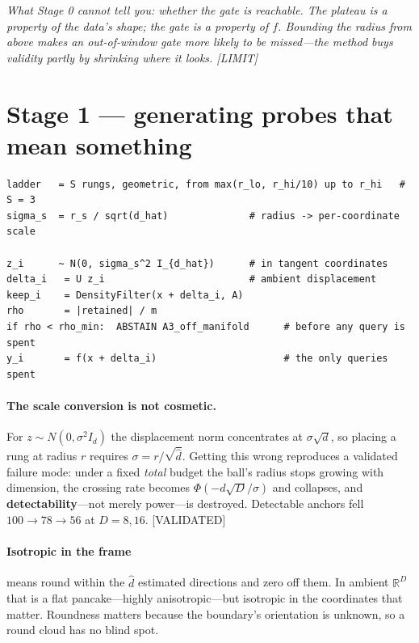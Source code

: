 \documentclass[11pt]{article}
\newcommand{\R}{\mathbb{R}}
\newcommand{\provtag}[2]{{\footnotesize\sffamily\textcolor{#1}{[#2]}}}
\newcommand{\VALID}{\provtag{okgreen}{VALIDATED}}
\newcommand{\LIMIT}{\provtag{limred}{LIMIT}}
\newcommand{\why}[1]{\par\smallskip\noindent\textcolor{muted}{\small\itshape #1}\par\smallskip}
\begin{document}
\why{What Stage 0 cannot tell you: whether the gate is \emph{reachable}. The plateau is a property
of the data's shape; the gate is a property of $f$. Bounding the radius from above makes an
out-of-window gate \emph{more} likely to be missed---the method buys validity partly by shrinking
where it looks. \LIMIT}

\section{Stage 1 --- generating probes that mean something}
\label{sec:stage1}

\begin{codebox}
\begin{verbatim}
ladder   = S rungs, geometric, from max(r_lo, r_hi/10) up to r_hi   # S = 3
sigma_s  = r_s / sqrt(d_hat)              # radius -> per-coordinate scale

z_i      ~ N(0, sigma_s^2 I_{d_hat})      # in tangent coordinates
delta_i   = U z_i                         # ambient displacement
keep_i    = DensityFilter(x + delta_i, A)
rho       = |retained| / m
if rho < rho_min:  ABSTAIN A3_off_manifold      # before any query is spent
y_i       = f(x + delta_i)                      # the only queries spent
\end{verbatim}
\end{codebox}

\paragraph{The scale conversion is not cosmetic.} For $z \sim N(0,\sigma^2 I_d)$ the displacement
norm concentrates at $\sigma\sqrt{d}$, so placing a rung at radius $r$ requires
$\sigma = r/\sqrt{\hat d}$. Getting this wrong reproduces a validated failure mode: under a fixed
\emph{total} budget the ball's radius stops growing with dimension, the crossing rate becomes
$\Phi(-d\sqrt{D}/\sigma)$ and collapses, and \textbf{detectability}---not merely power---is
destroyed. Detectable anchors fell $100 \to 78 \to 56$ at $D = 8, 16$. \VALID

\paragraph{Isotropic in the frame} means round within the $\hat d$ estimated directions and zero
off them. In ambient $\R^D$ that is a flat pancake---highly anisotropic---but isotropic in the
coordinates that matter. Roundness matters because the boundary's orientation is unknown, so a
round cloud has no blind spot.
\end{document}
